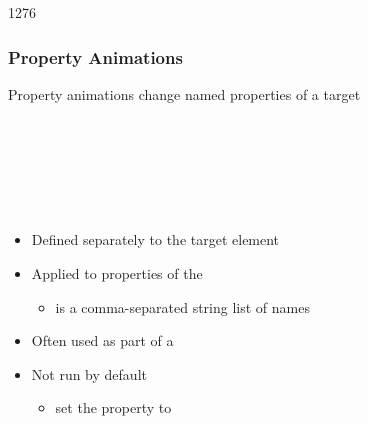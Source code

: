 \begin{slide}{1276}\frametitle{Property Animations}

Property animations change named properties of a target

\vspace*{0.5em}
\begin{qml}
\\
\\
\\
\\
\\
\qtt{\}}
\end{qml}

\vspace*{0.5em}
\begin{itemize}
\item Defined separately to the target element
\item Applied to properties of the 
  \begin{itemize}
  \item {} is a comma-separated string list of names
  \end{itemize}
\item Often used as part of a 
\item Not run by default
  \begin{itemize}
  \item set the  property to 
  \end{itemize}
\end{itemize}




\end{slide}


